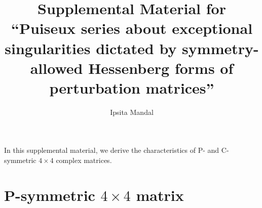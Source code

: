 \documentclass[aps, prl, onecolumn, nofootinbib, citeautoscript, nolongbibliography]{revtex4-2}
\begin{document}
\title{Supplemental Material for ``Puiseux series about exceptional singularities dictated by symmetry-allowed Hessenberg forms of perturbation matrices''}

\author{Ipsita Mandal}



\maketitle

In this supplemental material, we derive the characteristics of P- and C-symmetric $4\times 4$ complex matrices. 


\section{P-symmetric $4 \times 4$ matrix}
\label{app1}
\end{document}
